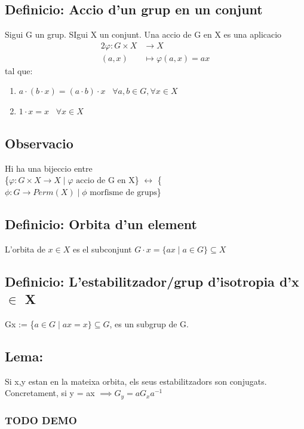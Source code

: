 \documentclass[11pt]{article}
\begin{document}
\subsection{Definicio: Accio d'un grup en un conjunt}
\label{sec:org62ee780}
Sigui G un grup. SIgui X un conjunt. Una accio de G en X es una aplicacio
\begin{alignat*}{2}
\varphi : G \times X &\to X \\
(a, x) &\mapsto \varphi(a,x) = ax
\end{alignat*}
tal que:
\begin{enumerate}
\item \(a \cdot (b \cdot x) = (a \cdot b) \cdot x \hspace{10pt}  \forall a,b \in G, \forall x \in X\)
\item \(1 \cdot x = x \hspace{10pt} \forall x \in X\)
\end{enumerate}
\subsection{Observacio}
\label{sec:org0ed754e}
Hi ha una bijeccio entre \\
\{\(\varphi: G \times X \to X \mid \varphi \text{ accio de G en X}\)\} \(\leftrightarrow\) \{\(\phi: G \to Perm(X) \mid \phi \text{ morfisme de grups}\)\}
\subsection{Definicio: Orbita d'un element}
\label{sec:orgbe199e9}
L'orbita de \(x \in X\) es el subconjunt \(G \cdot x = \{ax \mid a \in G \} \subseteq X\)
\subsection{Definicio: L'estabilitzador/grup d'isotropia d'x \(\in\) X}
\label{sec:orgdd8bb4b}
Gx := \{\(a \in G \mid ax = x \} \subseteq G\), es un subgrup de G.
\subsection{Lema:}
\label{sec:org4fe2954}
Si x,y estan en la mateixa orbita, els seus estabilitzadors son conjugats. \\
Concretament, si y = ax \(\implies G_y = aG_{x}a^{-1}\)
\subsubsection{{\bfseries\sffamily TODO} DEMO}
\label{sec:org1b3bc38}
\end{document}
